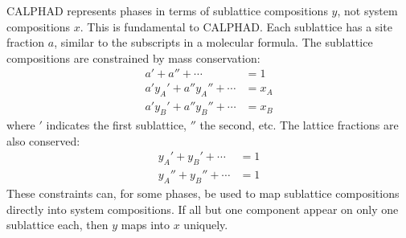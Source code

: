\documentclass[10pt]{article}
\begin{document}
		CALPHAD represents phases in terms of sublattice compositions $y$, not system compositions $x$.
		This is fundamental to CALPHAD.
		Each sublattice has a site fraction $a$, similar to the subscripts in a molecular formula.
		The sublattice compositions are constrained by mass conservation:
		\begin{align}
			a' + a'' + \cdots &= 1\\\nonumber
			a'y_A' + a''y_A'' + \cdots &= x_A\\\label{eqn:sublattice}
			a'y_B' + a''y_B'' + \cdots &= x_B
		\end{align}
		where $'$ indicates the first sublattice, $''$ the second, etc.
		The lattice fractions are also conserved:
		\begin{align}\nonumber
			y_A' + y_B' + \cdots &= 1\\
			y_A'' + y_B'' + \cdots &= 1
		\end{align}
		These constraints can, for some phases, be used to map sublattice compositions directly into system compositions.
		If all but one component appear on only one sublattice each, then $y$ maps into $x$ uniquely.
\end{document}
